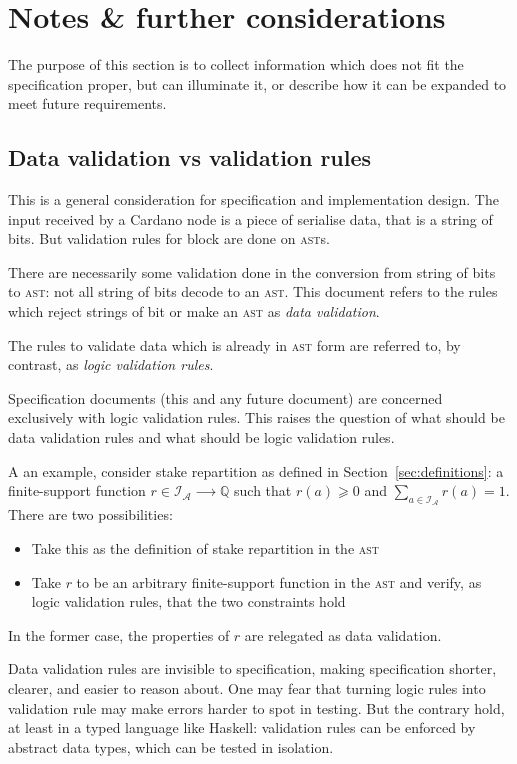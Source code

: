 \documentclass{article}
\newcommand{\idsof}[1]{\mathcal{I}\!_#1}
\newcommand{\agentids}{\idsof{\mathcal{A}}}
\begin{document}
\appendix

\section{Notes \& further considerations}
\label{sec:notes}

The purpose of this section is to collect information which does not
fit the specification proper, but can illuminate it, or describe how
it can be expanded to meet future requirements.

\subsection{Data validation vs validation rules}
\label{sec:data-validation-vs}

This is a general consideration for specification and implementation
design. The input received by a Cardano node is a piece of serialise
data, that is a string of bits. But validation rules for block are
done on \textsc{ast}s.

There are necessarily some validation done in the conversion from
string of bits to \textsc{ast}: not all string of bits decode to an
\textsc{ast}. This document refers to the rules which reject strings
of bit or make an \textsc{ast} as \emph{data validation}.

The rules to validate data which is already in \textsc{ast} form are
referred to, by contrast, as \emph{logic validation rules}.

Specification documents (this and any future document) are concerned
exclusively with logic validation rules. This raises the
question of what should be data validation rules and what should be
logic validation rules.

A an example, consider stake repartition as defined in
Section~\ref{sec:definitions}: a finite-support function $r∈\agentids
⟶ \mathbb{Q}$ such that $r(a) ⩾ 0$ and $∑_{a∈\agentids} r(a) =
1$. There are two possibilities:
\begin{itemize}
\item Take this as the definition of stake repartition in the
  \textsc{ast}
\item Take $r$ to be an arbitrary finite-support function in the
  \textsc{ast} and verify, as logic validation rules, that the two
  constraints hold
\end{itemize}
In the former case, the properties of $r$ are relegated as data
validation.

Data validation rules are invisible to specification, making
specification shorter, clearer, and easier to reason about. One may
fear that turning logic rules into validation rule may make errors
harder to spot in testing. But the contrary hold, at least in a typed
language like Haskell: validation rules can be enforced by abstract
data types, which can be tested in isolation.
\end{document}
